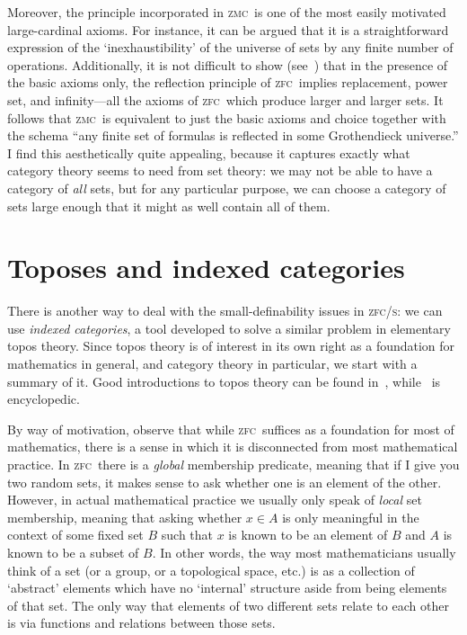 \documentclass[12pt]{amsart}
\def\zfc{\textsc{zfc}}
\def\zfcs{\textsc{zfc/s}}
\def\zmc{\textsc{zmc}}
\begin{document}
Moreover, the principle incorporated in \zmc\ is one of the most
easily motivated large-cardinal axioms.  For instance, it can be
argued that it is a straightforward expression of the
`inexhaustibility' of the universe of sets by any finite number of
operations.  Additionally, it is not difficult to show
(see~\cite{levy:strong-inf}) that in the presence of the basic axioms
only, the reflection principle of \zfc\ implies replacement, power
set, and infinity---all the axioms of \zfc\ which produce larger and
larger sets.  It follows that \zmc\ is equivalent to just the basic
axioms and choice together with the schema ``any finite set of
formulas is reflected in some Grothendieck universe.''  I find this
aesthetically quite appealing, because it captures exactly what
category theory seems to need from set theory: we may not be able to
have a category of \emph{all} sets, but for any particular purpose, we
can choose a category of sets large enough that it might as well
contain all of them.


\section{Toposes and indexed categories}
\label{sec:topos-indexed}

There is another way to deal with the small-definability issues in
\zfcs: we can use \emph{indexed categories}, a tool developed to solve
a similar problem in elementary topos theory.  Since topos theory is
of interest in its own right as a foundation for mathematics in
general, and category theory in particular, we start with a summary of
it.  Good introductions to topos theory can be found
in~\cite{mm:shv-gl,mclarty:ecat-etop}, while~\cite{ptj:elephant} is
encyclopedic.

By way of motivation, observe that while \zfc\ suffices as a
foundation for most of mathematics, there is a sense in which it is
disconnected from most mathematical practice.  In \zfc\ there is a
\emph{global} membership predicate, meaning that if I give you two
random sets, it makes sense to ask whether one is an element of the
other.  However, in actual mathematical practice we usually only speak
of \emph{local} set membership, meaning that asking whether $x\in A$
is only meaningful in the context of some fixed set $B$ such that $x$
is known to be an element of $B$ and $A$ is known to be a subset of
$B$.  In other words, the way most mathematicians usually think of a
set (or a group, or a topological space, etc.) is as a collection of
`abstract' elements which have no `internal' structure aside from
being elements of that set.  The only way that elements of two
different sets relate to each other is via functions and relations
between those sets.
\end{document}
